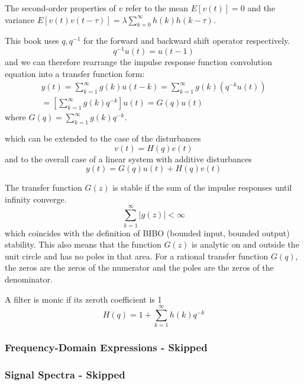 The second-order properties of $v$ refer to the mean $E[v(t)] = 0$ and the variance $E[v(t) v(t-\tau)] = \lambda \sum_{k=0}^{\infty} h(k) h(k-\tau)$.

This book uses $q, q^{-1}$ for the forward and backward shift operator respectively.
\begin{equation}
    q^{-1} u(t) = u(t-1)
\end{equation}
and we can therefore rearrange the impulse response function convolution equation into a transfer function form:
\begin{gather}
    y(t) = \sum_{k=1}^{\infty} g(k) u(t-k) = \sum_{k=1}^{\infty} g(k) (q^{-k} u(t)) \\ 
    = [\sum_{k=1}^{\infty} g(k) q^{-k}] u(t) = G(q) u(t)
\end{gather}
where $G(q) = \sum_{k=1}^{\infty} g(k) q^{-k}$.

which can be extended to the case of the disturbances
\begin{equation}
    v(t) = H(q) e(t)
\end{equation}
and to the overall case of a linear system with additive disturbances
\begin{equation}
    y(t) = G(q) u(t) + H(q) v(t)
\end{equation}

The transfer function $G(z)$ is stable if the sum of the impulse responses until infinity converge.
\begin{equation}
    \sum_{k=1}^{\infty} |g(z)| < \infty
\end{equation}
which coincides with the definition of BIBO (bounded input, bounded output) stability.
This also means that the function $G(z)$ is analytic on and outside the unit circle and has no poles in that area.
For a rational transfer function $G(q)$, the zeros are the zeros of the numerator and the poles are the zeros of the denominator.

A filter is monic if its zeroth coefficient is 1
\begin{equation}
    H(q) = 1+ \sum_{k=1}^{\infty} h(k) q^{-k}
\end{equation}

\subsubsection{Frequency-Domain Expressions - Skipped}
\subsubsection{Signal Spectra - Skipped}
